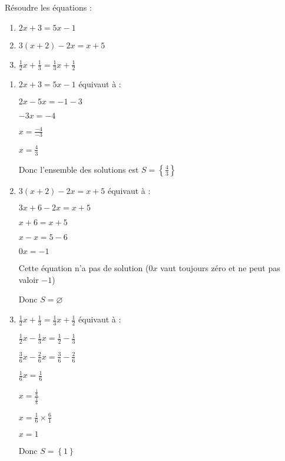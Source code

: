 
%
Résoudre les équations :
\begin{enumerate}
     \item
     $2x+3=5x-1$
     \item
     $3\left(x+2\right)-2x=x+5$
     \item
$\frac{1}{2}x+\frac{1}{3}=\frac{1}{3}x+\frac{1}{2}$\end{enumerate}
\begin{corrige}
     \begin{enumerate}
          \item
          $2x+3=5x-1$ équivaut à :
          \par
          $2x-5x=-1-3$
          \par
          $-3x=-4$
          \par
          $x=\frac{-4}{-3}$
          \par
          $x=\frac{4}{3}$
          \par
          Donc l'ensemble des solutions est $S=\left\{\frac{4}{3}\right\}$
          \item
          $3\left(x+2\right)-2x=x+5$  équivaut à :
          \par
          $3x+6-2x=x+5$
          \par
          $x+6=x+5$
          \par
          $x-x=5-6$
          \par
          $0x=-1$
          \par
          Cette équation n'a pas de solution ($0x$ vaut toujours zéro et ne peut pas valoir $-1$)
          \par
          Donc $S=\varnothing$
          \item
          $\frac{1}{2}x+\frac{1}{3}=\frac{1}{3}x+\frac{1}{2}$  équivaut à :
          \par
          $\frac{1}{2}x-\frac{1}{3}x=\frac{1}{2}-\frac{1}{3}$
          \par
          $\frac{3}{6}x-\frac{2}{6}x= \frac{3}{6}-\frac{2}{6}$
          \par
          $\frac{1}{6}x= \frac{1}{6}$
          \par
          $x= \frac{\frac{1}{6}}{\frac{1}{6}}$
          \par
          $x= \frac{1}{6}\times \frac{6}{1}$
          \par
          $x= 1$
          \par
          Donc $S=\left\{1\right\}$
     \end{enumerate}
\end{corrige}

